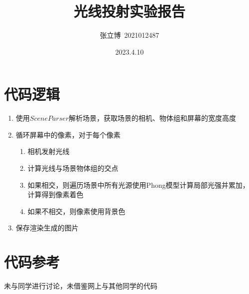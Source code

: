 \documentclass[12pt,a4paper]{article}
\title{\textbf{光线投射实验报告}}
\author{张立博\ 2021012487}
\date{2023.4.10}
\begin{document}
\maketitle

\section{代码逻辑}
\begin{enumerate}
    \item 使用$SceneParser$解析场景，获取场景的相机、物体组和屏幕的宽度高度
    \item 循环屏幕中的像素，对于每个像素
        \begin{enumerate}
            \item 相机发射光线
            \item 计算光线与场景物体组的交点
            \item 如果相交，则遍历场景中所有光源使用Phong模型计算局部光强并累加，计算得到像素着色
            \item 如果不相交，则像素使用背景色
        \end{enumerate}
    \item 保存渲染生成的图片
\end{enumerate}

\section{代码参考}
未与同学进行讨论，未借鉴网上与其他同学的代码
\end{document}
